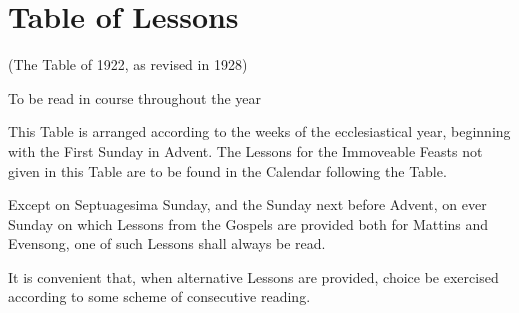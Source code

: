 \chapter{Table of Lessons}
(The Table of 1922, as revised in 1928)

To be read in course throughout the year

This Table is arranged according to the weeks of the ecclesiastical year, beginning with the First Sunday in Advent.  The Lessons for the Immoveable Feasts not given in this Table are to be found in the Calendar following the Table.

Except on Septuagesima Sunday, and the Sunday next before Advent, on ever Sunday on which Lessons from the Gospels are provided both for Mattins and Evensong, one of such Lessons shall always be read.

It is convenient that, when alternative Lessons are provided, choice be exercised according to some scheme of consecutive reading.

\newcommand \one {{\addfontfeature{Numbers=Proportional}(1)}\ }
\newcommand \two {{\addfontfeature{Numbers=Proportional}(2)}\ }

